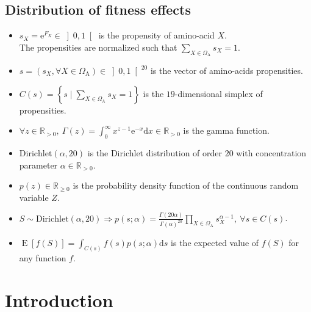\documentclass{article}
\newcommand{\e}{\mathrm{e}}
\newcommand{\der}{\mathrm{d}}
\newcommand{\SetAa}{\Omega_{\mathrm{A}}}
\begin{document}
    \subsection{Distribution of fitness effects}
    \begin{itemize}
        \item $s_X = \e^{F_X} \in \left]0,1\right[ $ is the propensity of amino-acid $X$.\\
        The propensities are normalized such that $\sum_{X \in \SetAa}s_X = 1 $.
		\item $s = \left( s_X , \forall X \in \SetAa \right) \in \left]0,1\right[^{20} $ is the vector of amino-acids propensities.
		\item $C(s) = \left\{ s \mid \sum_{X \in \SetAa} s_X = 1  \right\} $ is the $19$-dimensional simplex of propensities.
		\item $\forall z \in \mathbb{R}_{>0}, \ \Gamma(z) = \int_{0}^{\infty} x^{z-1} \e^{-x} \der x \in \mathbb{R}_{>0} $ is the gamma function.
		\item $\mathrm{Dirichlet}(\alpha, 20)$ is the Dirichlet distribution of order $20$ with concentration parameter $\alpha \in \mathbb{R}_{>0}$.
		\item $p(z) \in \mathbb{R}_{\geq 0}$ is the probability density function of the continuous random variable $Z$.
		\item $S \sim \mathrm{Dirichlet}(\alpha, 20) \Rightarrow	p(s; \alpha) = {\frac {\Gamma (20 \alpha)}{\Gamma (\alpha )^{20}}} \prod_{X \in \SetAa} s_X^{\alpha-1}, \ \forall s \in C(s)$.
		\item $\operatorname{E}[f(S)] = \int_{C(s)} f(s) p(s; \alpha) \der s$ is the expected value of $f(S)$ for any function $f$.
    \end{itemize}

    \section{Introduction}
\end{document}
